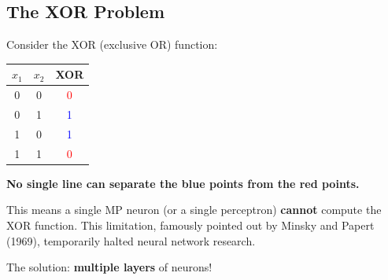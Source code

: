 \subsection{The XOR Problem}

Consider the XOR (exclusive OR) function:

\begin{center}
\begin{tabular}{|c|c|c|}
\hline
$x_1$ & $x_2$ & XOR \\ \hline
0 & 0 & \textcolor{red}{0} \\ \hline
0 & 1 & \textcolor{blue}{1} \\ \hline
1 & 0 & \textcolor{blue}{1} \\ \hline
1 & 1 & \textcolor{red}{0} \\ \hline
\end{tabular}
\end{center}

\begin{center}
\end{center}

\begin{importantbox}
\textbf{No single line can separate the blue points from the red points.}

This means a single MP neuron (or a single perceptron) \textbf{cannot} compute the XOR function. This limitation, famously pointed out by Minsky and Papert (1969), temporarily halted neural network research.

The solution: \textbf{multiple layers} of neurons!
\end{importantbox}


